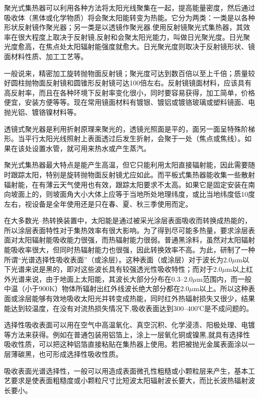 \documentclass{ctexbook}
\begin{document}
聚光式集热器可以利用各种方法将太阳光线聚集在一起，提高能量密度，然后通过吸收体（黑体或化学物质）将会聚太阳能转变为热能。它分为两类：一类是以各种形状反射镜作聚光器；另一类是以透镜作聚光器.使用反射镜聚光式集热器，其效率在很大程度上取决于反射镜,反射和会聚太阳光能力，叫做日光聚光度。日光聚光度愈高，在焦点处太阳辐射能强度就愈大。日光聚光度则取决于反射镜形状、镜面材料性质、加工工艺等。

一般说来，精密加工旋转抛物面反射镜；聚光度可达到数百倍以至上千倍；质量较好圆柱抛物面反射镜和圆锥形反射镜可达100倍左右。反射镜镜面材料，应该具有高反射率，而且在各种环境下反射率变化很小，同时要容易获得，加工简单，价格便宜，安装方便等等。现在常用镜面材料有镀银、镀铝或镀铬玻璃或塑料镜面、电抛光铝、镀铬镍材料等。

透镜式聚光器是利用折射原理来聚光的，透镜光照面是平的，面另一面呈特殊阶梯形。当平行太阳光线照射上表面透过后发生折射，会聚于一处（焦点或焦线）。如果在该处设置水管，就可用来热水或产生蒸汽。

聚光式集热器最大特点是能产生高温，但它只能利用太阳直接辐射能，因此需要随时跟踪太阳，特别是旋转抛物面反射镜尤应如此。而平板式集热器能收集一些散射辐射能，在有薄云天气使用也有效，跟踪太阳要求不太高。如果它是固定安装在南向坡面上的，则坡面角大小大体上应等于当地所处地理纬度，或比当地纬度低10度左右，视设备是全年使用还是只在春、夏、秋三季使用而定。

在大多数光--热转换装置中，太阳能是通过被采光涂层表面吸收而转换成热能的，所以涂层表面特性对于集热效率有很大影响。为了得到尽可能多热量，要求涂层表面对太阳辐射能吸收能力很强，而热辐射能力很弱。普通黑涂料，虽然对太阳辐射能吸收率很大，但同时热辐射能力也很强，因此转换效率不高。为此，研制了一种所谓“光谱选择性吸收表面”（或涂层）。这种表面（或涂层）对于波长为2.0$\mu$m以下光谱来说是黑的，即对这些波长具有较强透光性吸收特性；而对于2.0$\mu$m以上红外光谱来说，由于地面上太阳能，其波长大部分分布在0.3--2.0$\mu$m范围内，而一般中温（小于900K）物体所辐射出红外线波长绝大部分都在2.0$\mu$m以上。所以这种表面或涂层能够有效地吸收太阳光并转变成热能，同时红外热辐射损失又很少，结果能达到较温度，在没有对流热损失情况下,吸收表面达到300--400℃是不成问题的。

选择性吸收表面可以用在空气中高温氧化、真空沉积、化学浸渍、阳极处理、电镀等方法来获得。例如在普通包装用铝箔上，涂上一层氧化铜或镍黑,就具有选择性吸收性质，可以把这种铝箔直接粘贴在集热器上使用。若把被抛光金属表面涂以一层薄碳黑，也可形成选择性吸收性质。

吸收表面光谱选择性，一般可以用造成表面微孔性粗糙或小颗粒层来产生，基本工艺要求是使表面粗糙度或小颗粒尺寸比短波太阳辐射波长要大，而比长波热辐射波长要小。
\end{document}
